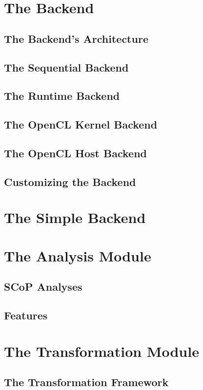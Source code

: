 \section{The Backend}
\subsection{The Backend's Architecture}
\subsection{The Sequential Backend}
\subsection{The Runtime Backend}
\subsection{The OpenCL Kernel Backend}
\subsection{The OpenCL Host Backend}
\subsection{Customizing the Backend}

\section{The Simple Backend}

\section{The Analysis Module}
\subsection{SCoP Analyses}
\subsection{Features}

\section{The Transformation Module}
\subsection{The Transformation Framework}
